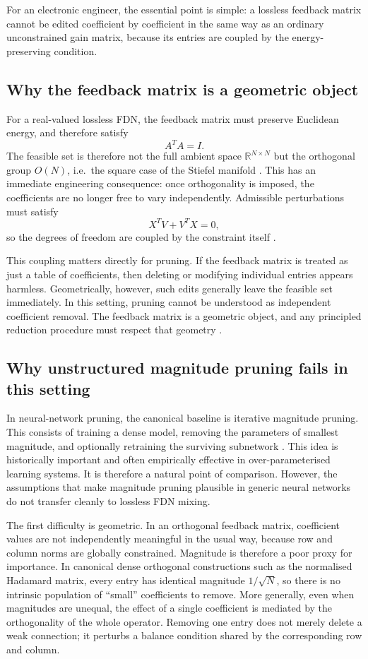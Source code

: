 \documentclass[12pt,a4paper]{article}
\begin{document}
For an electronic engineer, the essential point is simple: a lossless feedback
matrix cannot be edited coefficient by coefficient in the same way as an
ordinary unconstrained gain matrix, because its entries are coupled by the
energy-preserving condition.

\subsection{Why the feedback matrix is a geometric object}

For a real-valued lossless FDN, the feedback matrix must preserve
Euclidean energy, and therefore satisfy
\[
A^T A = I.
\]
The feasible set is therefore not the full ambient space
$\mathbb{R}^{N \times N}$ but the orthogonal group $O(N)$, i.e.\ the square
case of the Stiefel manifold \cite{boumal}. This has an immediate engineering
consequence: once orthogonality is imposed, the coefficients are no longer free
to vary independently. Admissible perturbations must satisfy
\[
X^T V + V^T X = 0,
\]
so the degrees of freedom are coupled by the constraint itself \cite{boumal}.

This coupling matters directly for pruning. If the feedback matrix
is treated as just a table of coefficients, then deleting or modifying
individual entries appears harmless. Geometrically, however, such
edits generally leave the feasible set immediately. In this setting,
pruning cannot be understood as independent coefficient removal.
The feedback matrix is a geometric object, and any principled
reduction procedure must respect that geometry \cite{boumal}.

\subsection{Why unstructured magnitude pruning fails in this setting}

In neural-network pruning, the canonical baseline is iterative
magnitude pruning. This consists of training a dense model, removing the parameters of
smallest magnitude, and optionally retraining the surviving
subnetwork \cite{frankle}. This idea is historically important
and often empirically effective in over-parameterised learning
systems. It is therefore a natural point of comparison. However,
the assumptions that make magnitude pruning plausible in generic
neural networks do not transfer cleanly to lossless FDN mixing.

The first difficulty is geometric. In an orthogonal feedback matrix,
coefficient values are not independently meaningful in the usual
way, because row and column norms are globally constrained.
Magnitude is therefore a poor proxy for importance. In canonical
dense orthogonal constructions such as the normalised Hadamard
matrix, every entry has identical magnitude $1/\sqrt{N}$, so there
is no intrinsic population of ``small'' coefficients to remove. More
generally, even when magnitudes are unequal, the effect of a single
coefficient is mediated by the orthogonality of the whole operator.
Removing one entry does not merely delete a weak connection; it
perturbs a balance condition shared by the corresponding row and
column.
\end{document}

